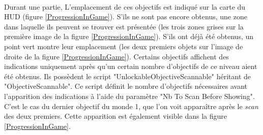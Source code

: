 		\begin{minipage}{\linewidth}
			\label{ProgressionAtLevelSelection}
		\end{minipage}\medskip
		\\
		
		Durant une partie, L'emplacement de ces objectifs est indiqué sur la carte du HUD (figure \ref{ProgressionInGame}).
		S'ils ne sont pas encore obtenus, une zone dans laquelle ils peuvent se trouver est présentée (les trois zones grises sur la première image de la figure \ref{ProgressionInGame}). S'ils ont déjà été obtenus, un point vert montre leur emplacement (les deux premiers objets sur l'image de droite de la figure \ref{ProgressionInGame}). Certains objectifs affichent des indications uniquement après qu'un certain nombre d'objectifs de ce niveau aient été obtenus. Ils possèdent le script "UnlockableObjectiveScannable" héritant de "ObjectiveScannable". Ce script définit le nombre d'objectifs nécessaires avant l'apparition des indications à l'aide du paramètre "Nb To Scan Before Showing". C'est le cas du dernier objectif du monde 1, que l'on voit apparaître après le \textit{scan} des deux premiers. Cette apparition est également visible dans la figure \ref{ProgressionInGame}.\medskip
		
